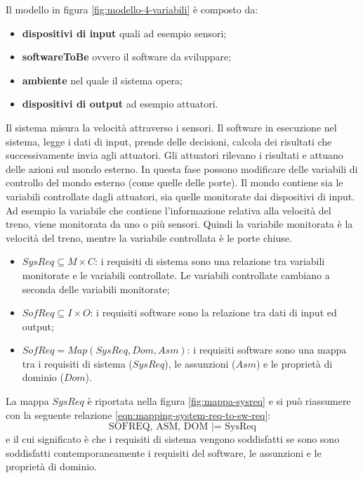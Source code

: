 Il modello in figura \ref{fig:modello-4-variabili} è composto da:
\begin{itemize}
	\item \textbf{dispositivi di input} quali ad esempio sensori;
	\item \textbf{softwareToBe} ovvero il software da sviluppare;
	\item \textbf{ambiente} nel quale il sistema opera;
	\item \textbf{dispositivi di output} ad esempio attuatori.
\end{itemize}
Il sistema misura la velocità attraverso i sensori. Il software in esecuzione nel sistema, legge i dati di input, prende delle decisioni, calcola dei risultati che successivamente invia agli attuatori. Gli attuatori rilevano i risultati e attuano delle azioni sul mondo esterno. In questa fase possono modificare delle variabili di controllo del mondo esterno (come quelle delle porte). Il mondo contiene sia le variabili controllate dagli attuatori, sia quelle monitorate dai dispositivi di input. Ad esempio la variabile che contiene l'informazione relativa alla velocità del treno, viene monitorata da uno o più sensori. Quindi la variabile monitorata è la velocità del treno, mentre la variabile controllata è le porte chiuse.
\begin{itemize}
	\item 	$SysReq \subseteq M \times C$: i requisiti di sistema sono una relazione tra variabili monitorate e le variabili controllate. Le variabili controllate cambiano a seconda delle variabili monitorate;
	\item $SofReq \subseteq I \times O$: i requisiti software sono la relazione tra dati di input ed output;
	\item $SofReq = Map(SysReq, Dom, Asm)$: i requisiti software sono una mappa tra i requisiti di sistema ($SysReq$), le assunzioni ($Asm$) e le proprietà di dominio ($Dom$).
\end{itemize}
La mappa $SysReq$ è riportata nella figura \ref{fig:mappa-sysreq} e si può riassumere con la seguente relazione \ref{eqn:mapping-system-req-to-sw-req}:
\begin{equation}
	\text{SOFREQ, ASM, DOM |= SysReq}
	\label{eqn:mapping-system-req-to-sw-req}
\end{equation}
e il cui significato è che i requisiti di sistema vengono soddisfatti se sono sono soddisfatti contemporaneamente i requisiti del software, le assunzioni e le proprietà di dominio.
